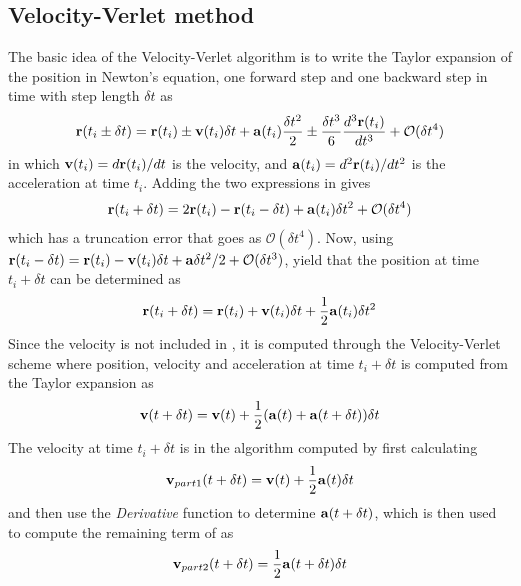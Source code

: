 \subsection{Velocity-Verlet method}
\label{sec:methodVV}
The basic idea of the Velocity-Verlet algorithm is to write the Taylor expansion of the position in Newton’s equation, one forward step and one backward step in time with step length $\delta t$ as
\begin{align}
	\mbox{\textbf{r}}(t_i \pm \delta t) = \mbox{\textbf{r}}(t_i) \pm \mbox{\textbf{v}} (t_i) \delta t
	+ \mbox{\textbf{a}} (t_i) \frac{\delta t ^2}{2}  \pm \frac{\delta t ^3}{6} \frac{d^3 \mbox{\textbf{r}}(t_i)}{dt^3} + \mathcal{O}(\delta t ^4 )
	\label{eq:TaylorExpVVmethod}
\end{align}
in which $\mbox{\textbf{v}}(t_i) = d\mbox{\textbf{r}}(t_i)/dt$ is the velocity, and $\mbox{\textbf{a}}(t_i) = d^2 \mbox{\textbf{r}}(t_i)/dt^2$ is the acceleration at time $t_i$.
Adding the two expressions in  gives
\begin{align}
	\mbox{\textbf{r}} (t_i +\delta t) = 2\mbox{\textbf{r}} (t_i) - \mbox{\textbf{r}} (t_i -\delta t)  + \mbox{\textbf{a}} (t_i ) \delta t^2 + \mathcal{O} (\delta t ^4 )
	\label{eq:TaylorExpVVmethod2}
\end{align}
which has a truncation error that goes as $\mathcal{O} (\delta t ^4 )$.
Now, using $\mbox{\textbf{r}}(t_i-\delta t) = \mbox{\textbf{r}}(t_i) - \mbox{\textbf{v}}(t_i) \delta t + \mbox{\textbf{a}} \delta t^2 /2 + \mathcal{O} (\delta t^3)$, yield that the position at time $t_i+\delta t$ can be determined as 
\begin{align}
	\mbox{\textbf{r}}(t_i+\delta t) = \mbox{\textbf{r}}(t_i) + \mbox{\textbf{v}} (t_i) \delta t + \frac{1}{2} \mbox{\textbf{a}} (t_i) \delta t^2 
	\label{eq:VVmethodNextPosition}
\end{align}
Since the velocity is not included in , it is computed through the Velocity-Verlet scheme where position, velocity and acceleration at time $t_i+\delta t$ is computed from the Taylor expansion as
\begin{align}
	\mbox{\textbf{v}} (t + \delta t) = \mbox{\textbf{v}} (t) + \frac{1}{2} ( \mbox{\textbf{a}} (t) + \mbox{\textbf{a}} (t + \delta t) ) \delta t
	\label{eq:VVmethodNextVelocity}
\end{align}
The velocity at time $t_i+\delta t$ is in the algorithm computed by first calculating 
\begin{align}
	\mbox{\textbf{v}}_{part1} (t + \delta t) = \mbox{\textbf{v}} (t) + \frac{1}{2}  \mbox{\textbf{a}} (t)  \delta t
	\label{eq:VVmethodNextVelocityPart1}
\end{align}
and then use the \textit{Derivative} function to determine $\mbox{\textbf{a}} (t + \delta t)$, which is then used to compute the remaining term of  as 
\begin{align}
	\mbox{\textbf{v}}_{part2} (t + \delta t) = \frac{1}{2} \mbox{\textbf{a}} (t + \delta t) \delta t
	\label{eq:VVmethodNextVelocityPart2}
\end{align}

